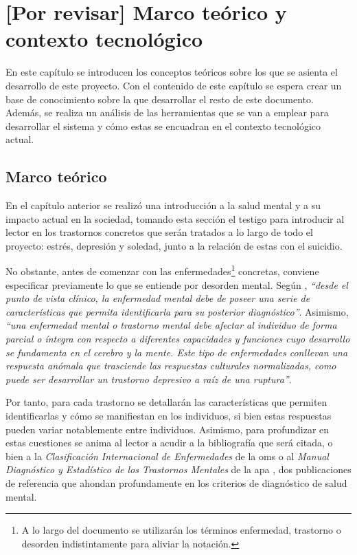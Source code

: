 \chapter{[Por revisar] Marco teórico y contexto tecnológico}
\label{chapter:marco_teorico}


En este capítulo se introducen los conceptos teóricos sobre los que se asienta el desarrollo de este proyecto. Con el contenido de este capítulo se espera crear un base de conocimiento sobre la que desarrollar el resto de este documento. Además, se realiza un análisis de las herramientas que se van a emplear para desarrollar el sistema y cómo estas se encuadran en el contexto tecnológico actual.

\section{Marco teórico}
    \label{section:marco_teorico}

    En el capítulo anterior se realizó una introducción a la salud mental y a su impacto actual en la sociedad, tomando esta sección el testigo para introducir al lector en los trastornos concretos que serán tratados a lo largo de todo el proyecto: estrés, depresión y soledad, junto a la relación de estas con el suicidio.

    No obstante, antes de comenzar con las enfermedades\footnote{A lo largo del documento se utilizarán los términos enfermedad, trastorno o desorden indistintamente para aliviar la notación.} concretas, conviene especificar previamente lo que se entiende por desorden mental. Según \cite{ortega_gonzalez_enfermedades_2021}, \textit{``desde el punto de vista clínico, la enfermedad mental debe de poseer una serie de características que permita identificarla para su posterior diagnóstico''}. Asimismo, \textit{``una enfermedad mental o trastorno mental debe afectar al individuo de forma parcial o íntegra con respecto a diferentes capacidades y funciones cuyo desarrollo se fundamenta en el cerebro y la mente. Este tipo de enfermedades conllevan una respuesta anómala que trasciende las respuestas culturales normalizadas, como puede ser desarrollar un trastorno depresivo a raíz de una ruptura''}.

    Por tanto, para cada trastorno se detallarán las características que permiten identificarlas y cómo se manifiestan en los individuos, si bien estas respuestas pueden variar notablemente entre individuos. Asimismo, para profundizar en estas cuestiones se anima al lector a acudir a la bibliografía que será citada, o bien a la \textit{Clasificación Internacional de Enfermedades} de la \gls{oms} \cite{oms_clasificacion_nodate} o al \textit{Manual Diagnóstico y Estadístico de los Trastornos Mentales} de la \gls{apa} \cite{american_psychological_association_manual_2014}, dos publicaciones de referencia que ahondan profundamente en los criterios de diagnóstico de salud mental.

